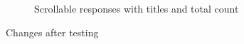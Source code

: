 \begin{figure}[!htb]
\begin{subfigure}{.55\textwidth}
        \caption{Scrollable responses with titles and total count}
        \label{fig:testing-changes-responses}
    \end{subfigure}%

    \caption{Changes after testing}
    \label{fig:testing-screenshots}
\end{figure}